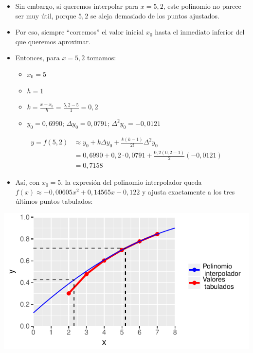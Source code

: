 \documentclass[]{book}
\providecommand{\tightlist}{%
  \setlength{\itemsep}{0pt}\setlength{\parskip}{0pt}}
\begin{document}
\begin{itemize}
\item
  Sin embargo, si queremos interpolar para \(x = 5,2\), este polinomio no parece ser muy útil, porque \(5,2\) se aleja demasiado de los puntos ajustados.
\item
  Por eso, siempre ``corremos'' el valor inicial \(x_0\) hasta el inmediato inferior del que queremos aproximar.
\item
  Entonces, para \(x=5,2\) tomamos:

  \begin{itemize}
  \tightlist
  \item
    \(x_0 = 5\)
  \item
    \(h = 1\)
  \item
    \(k = \frac{x-x_0}{h} = \frac{5,2-5}{1} = 0,2\)
  \item
    \(y_0 = 0,6990\); \(\Delta y_0 = 0,0791\); \(\Delta^2 y_0 = -0,0121\)
  \end{itemize}
\end{itemize}

\[
\begin{aligned}
y = f(5,2) &\approx y_0 + k \Delta y_0 + \frac{k(k-1)}{2!}\Delta^2 y_0 \\
  & = 0,6990 + 0,2 \cdot 0,0791 + \frac{0,2 (0,2-1)}{2} (-0,0121) \\
  & = 0,7158
\end{aligned}
\]

\begin{itemize}
\tightlist
\item
  Así, con \(x_0 = 5\), la expresión del polinomio interpolador queda \(f(x) \approx -0,00605 x^2 + 0,14565 x - 0,122\) y ajusta exactamente a los tres últimos puntos tabulados:
\end{itemize}

\begin{center}\includegraphics[width=0.95\linewidth]{Plots/U4/Unidad4_g3} \end{center}
\end{document}
